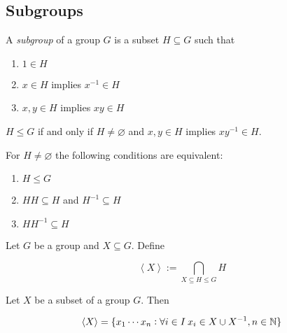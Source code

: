 \subsection{Subgroups}
\begin{definition}
	A \emph{subgroup} of a group $G$ is a subset $H \subseteq G$ such that

	\begin{enumerate}[label = (\arabic*)]
		\item $1 \in H$\\
		\item $x \in H$ implies $x^{-1} \in H$\\
		\item $x,y \in H$ implies $xy \in H$
	\end{enumerate}
\end{definition}

\vspace{2mm}

\begin{proposition}
	$H \leq G$ if and only if $H \neq \varnothing$ and $x,y \in H$ implies $xy^{-1} \in H$.
\end{proposition}

\vspace{2mm}

\begin{proposition}
	For $H \neq \varnothing$ the following conditions are equivalent:
	
	\begin{enumerate}[label = (\arabic*)]
		\item $H \leq G$\\
		\item $HH \subseteq H$ and $H^{-1} \subseteq H$\\
		\item $HH^{-1} \subseteq H$
	\end{enumerate}
\end{proposition}

\vspace{2mm}

\begin{definition}
	Let $G$ be a group and $X \subseteq G$. Define

	\begin{equation}
		\left\langle X \right\rangle := \bigcap_{X \subseteq H \leq G} H
	\end{equation}
\end{definition}

\vspace{2mm}

\begin{proposition}
	Let $X$ be a subset of a group $G$. Then 

	\begin{equation}
		\left\langle X \right\rangle = \cbr[0]{ x_1 \cdots x_n : \forall i \in I \> x_i \in X \cup X^{-1}, n \in \mathbb{N} }
	\end{equation}
\end{proposition}



